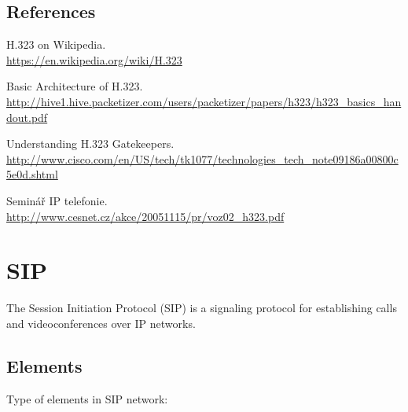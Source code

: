 \subsection{References}

\renewcommand{\bibsection}{}
\begin{thebibliography}{1}
H.323 on Wikipedia.
\\\url{https://en.wikipedia.org/wiki/H.323}

Basic Architecture of H.323.
\\\url{http://hive1.hive.packetizer.com/users/packetizer/papers/h323/h323_basics_handout.pdf}

Understanding H.323 Gatekeepers.
\\\url{http://www.cisco.com/en/US/tech/tk1077/technologies_tech_note09186a00800c5e0d.shtml}

Seminář IP telefonie.
\\\url{http://www.cesnet.cz/akce/20051115/pr/voz02_h323.pdf}
\end{thebibliography}

\section{SIP}

The Session Initiation Protocol (SIP) is a signaling protocol for establishing 
calls and videoconferences over IP networks.

\subsection{Elements}

Type of elements in SIP network:

